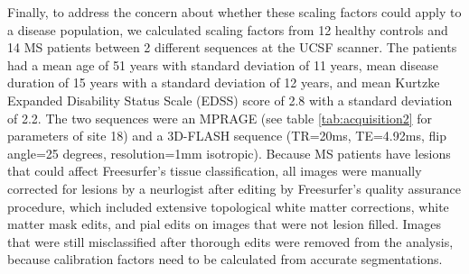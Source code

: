 Finally, to address the concern about whether these scaling factors could apply to a disease population, we calculated scaling factors from 12 healthy controls and 14 MS patients between 2 different sequences at the UCSF scanner. The patients had a mean age of 51 years with standard deviation of 11 years, mean disease duration of 15 years with a standard deviation of 12 years, and mean Kurtzke Expanded Disability Status Scale (EDSS) \cite{Kurtzke_1983} score of 2.8 with a standard deviation of 2.2. The two sequences were an MPRAGE (see table \ref{tab:acquisition2} for parameters of site 18) and a 3D-FLASH sequence (TR=20ms, TE=4.92ms, flip angle=25 degrees, resolution=1mm isotropic). Because MS patients have lesions that could affect Freesurfer's tissue classification, all images were manually corrected for lesions by a neurlogist after editing by Freesurfer's quality assurance procedure, which included extensive topological white matter corrections, white matter mask edits, and pial edits on images that were not lesion filled. Images that were still misclassified after thorough edits were removed from the analysis, because calibration factors need to be calculated from accurate segmentations.